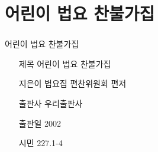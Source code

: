 \documentclass[aspectratio=1610,14pt,xcolor=pdftex,dvipsnames,table,handout]{beamer}
\begin{document}
		\section{ 어린이 법요 찬불가집 }
		\begin{frame} [t,plain]
		\frametitle{}
			\begin{block} { 어린이 법요 찬불가집 }
			\setlength{\leftmargini}{4em}			
			\begin{itemize}
				\item [제목]  	어린이 법요 찬불가집 
				\item [지은이]	법요집 편찬위원회 편저
				\item [출판사]	우리출판사
				\item [출판일]	2002
				\item [시민]		227.1-4	
			\end{itemize}
			\end{block}						
		\end{frame}						



\end{document}
